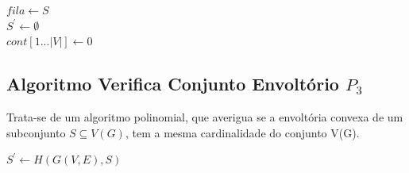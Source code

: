 
\begin{algorithm2e}
    \SetAlFnt{\tiny}
    \SetAlCapFnt{\small}
    \SetAlCapNameFnt{\small}
    \SetAlgoLined
    \DontPrintSemicolon
    \LinesNumbered
    \SetAlgoLined
    \BlankLine
    \BlankLine

    $fila \gets S$ \\
    $S^\prime \gets \emptyset$ \\
    $cont[1...|V|] \gets 0$\\
\caption{$H(G(V,E),S)$}
\label{alg:fecho-p3}
\end{algorithm2e} 


\subsection{Algoritmo Verifica Conjunto Envoltório $P_3$}

Trata-se de um algoritmo polinomial, 
que averigua se a envoltória convexa de um subconjunto $S \subseteq V(G)$, 
tem a mesma cardinalidade do conjunto V(G).

\begin{algorithm2e}
    \SetAlFnt{\tiny}
    \SetAlCapFnt{\small}
    \SetAlCapNameFnt{\small}
    \SetAlgoLined
    \DontPrintSemicolon
    \LinesNumbered
    \SetAlgoLined
    \BlankLine
    \BlankLine
    $S^\prime \gets H(G(V,E),S)$ \\
\caption{$ConjuntoEnvoltoria(G(V,E),S)$}
\label{alg:conjunto-envoltoria-p3}
\end{algorithm2e}

